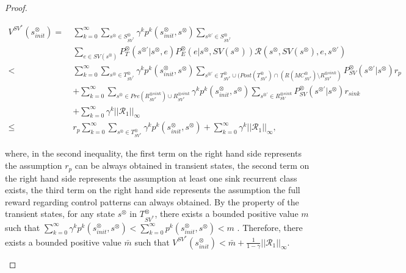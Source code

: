 \documentclass[10pt]{article}
\theoremstyle{definition}
\begin{document}
\begin{proof}
\begin{enumerate}
  \begin{align}
    V^{SV^{\ast}}\!(s^{\otimes}_{init})
    =\ & \sum_{k=0}^{\infty} \sum_{s^{\otimes} \in S^{\otimes}_{SV^{\ast}}} \gamma^k p^k(s^{\otimes}_{init}, s^{\otimes}) \sum_{s^{\otimes \prime} \in S^{\otimes}_{SV^{\ast}}} \nonumber \\
     & \sum_{e \in SV(s^{\otimes})} P^{\otimes}_T (s^{\otimes \prime} | s^{\otimes}, e) P^{\otimes}_E (e | s^{\otimes}, SV(s^{\otimes})) \mathcal{R}(s^{\otimes}, SV(s^{\otimes}), e, s^{\otimes \prime})  \nonumber \\
     <\ & \sum_{k=0}^{\infty} \sum_{s^{\otimes} \in T^{\otimes}_{SV^{\ast}}} \gamma^k p^k(s^{\otimes}_{init}, s^{\otimes}) \sum_{s^{\otimes \prime} \in T^{\otimes}_{SV^{\ast}} \cup ( Post(T^{\otimes}_{SV^{\ast}}) \cap (R(MC^{\otimes}_{SV^{\ast}}) \setminus R^{\otimes sink}_{SV^{\ast}})} P^{\otimes}_{SV} (s^{\otimes \prime} | s^{\otimes}) r_p \nonumber \\
     & + \sum_{k=0}^{\infty} \sum_{s^{\otimes} \in Pre(R^{\otimes sink}_{SV^{\ast}}) \cup R^{\otimes sink}_{SV^{\ast}}} \gamma^k p^k(s^{\otimes}_{init}, s^{\otimes}) \sum_{s^{\otimes \prime} \in R^{\otimes sink}_{SV}} P^{\otimes}_{SV}(s^{\otimes \prime}|s^{\otimes}) r_{sink}  \nonumber \\
     & + \sum_{k=0}^{\infty} \gamma^k ||\mathcal{R}_1||_{\infty} \nonumber \\
     \leq\ & r_p \sum_{k=0}^{\infty} \sum_{s^{\otimes} \in T^{\otimes}_{SV^{\ast}}} \gamma^k p^k(s^{\otimes}_{init}, s^{\otimes}) + \sum_{k=0}^{\infty} \gamma^k ||\mathcal{R}_1||_{\infty}, \nonumber
  \label{eqth11}
  \end{align}

  where, in the second inequality, the first term on the right hand side represents the assumption $r_p$ can be always obtained in transient states, the second term on the right hand side represents the assumption at least one sink recurrent class exists, the third term on the right hand side represents the assumption the full reward regarding control patterns can always obtained.
  By the property of the transient states, for any state $s^{\otimes}$ in $T^{\otimes}_{SV^{\ast}}$, there exists a bounded positive value $m$ such that $ \sum_{k=0}^{\infty} \gamma^k p^k(s^{\otimes}_{init}, s^{\otimes}) < \sum_{k=0}^{\infty} p^k(s^{\otimes}_{init}, s^{\otimes}) < m$ \cite{ESS}. Therefore, there exists a bounded positive value $\bar{m}$ such that $V^{SV^{\ast}}(s^{\otimes}_{init}) < \bar{m} + \frac{1}{1-\gamma} ||\mathcal{R}_1||_{\infty}$.


\end{enumerate}
\end{proof}
\end{document}
